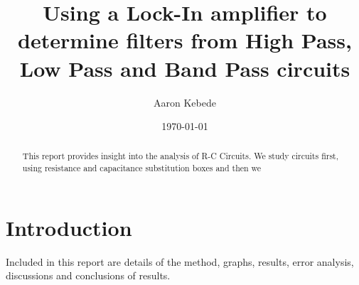 \documentclass[a4paper]{article}\usepackage[english]{babel}
\title{Using a Lock-In amplifier to determine filters from High Pass, Low Pass and Band Pass circuits }
\author{Aaron Kebede}
\date{\today}
\begin{document}
\maketitle
\begin{abstract}
This report provides insight into the analysis of R-C Circuits. We study circuits first, using resistance and capacitance substitution boxes and then we  
\end{abstract}

\section{Introduction}

Included in this report are details of the method, graphs, results, error analysis, discussions and conclusions of results.
\end{document}
